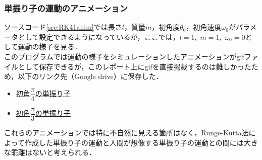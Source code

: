 \documentclass[a4paper,11pt]{jsarticle}
\begin{document}
\subsubsection{単振り子の運動のアニメーション}
ソースコード\ref{src:RK41anim}では長さ\(l\)，質量\(m\)，初角度\(\theta_0\)，初角速度\(\omega_0\)がパラメータとして設定できるようになっているが，ここでは，\(l=1\),\ \(m=1\),\ \(\omega_0=0\)として運動の様子を見る．\\
このプログラムでは運動の様子をシミュレーションしたアニメーションがgifファイルとして保存できるが，このレポート上にgifを直接掲載するのは難しかったため，以下のリンク先（Google drive）に保存した．
\begin{itemize}
  \item \href{https://drive.google.com/file/d/1HEMIiebBH-CA8qKj4L7jN1CmuGO9943t/view?usp=sharing}{初角\(\dfrac{\pi}{4}\)の単振り子}
  \item \href{https://drive.google.com/file/d/1J6pF6LpVSzd1oC3yWCBBsiJDz6IESJB8/view?usp=sharing}{初角\(\dfrac{\pi}{3}\)の単振り子}
\end{itemize}
これらのアニメーションでは特に不自然に見える箇所はなく，Runge-Kutta法によって作成した単振り子の運動と人間が想像する単振り子の運動との間には大きな乖離はないと考えられる．
\end{document}
